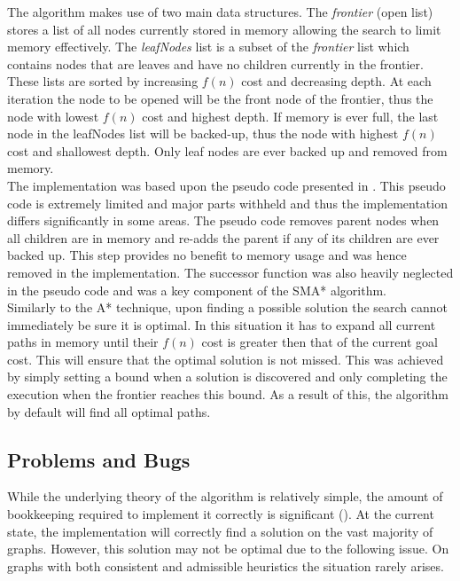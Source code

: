 \documentclass[]{article}
\begin{document}
The algorithm makes use of two main data structures. The \textit{frontier} (open list) stores a list of all nodes currently stored in memory allowing the search to limit memory effectively. The \textit{leafNodes} list is a subset of the \textit{frontier} list which contains nodes that are leaves and have no children currently in the frontier. These lists are sorted by increasing $f(n)$ cost and decreasing depth. At each iteration the node to be opened will be the front node of the frontier, thus the node with lowest $f(n)$ cost and highest depth. If memory is ever full, the last node in the leafNodes list will be backed-up, thus the node with highest $f(n)$ cost and shallowest depth. Only leaf nodes are ever backed up and removed from memory.\\

The implementation was based upon the pseudo code presented in \cite{russell_paper}. This pseudo code is extremely limited and major parts withheld and thus the implementation differs significantly in some areas. The pseudo code removes parent nodes when all children are in memory and re-adds the parent if any of its children are ever backed up. This step provides no benefit to memory usage and was hence removed in the implementation. The successor function was also heavily neglected in the pseudo code and was a key component of the SMA* algorithm.\\

Similarly to the A* technique, upon finding a possible solution the search cannot immediately be sure it is optimal. In this situation it has to expand all current paths in memory until their $f(n)$ cost is greater then that of the current goal cost. This will ensure that the optimal solution is not missed. This was achieved by simply setting a bound when a solution is discovered and only completing the execution when the frontier reaches this bound. As a result of this, the algorithm by default will find all optimal paths.

\pagebreak
\subsection*{Problems and Bugs}

While the underlying theory of the algorithm is relatively simple, the amount of bookkeeping required to implement it correctly is significant (\cite{norvig}). At the current state, the implementation will correctly find a solution on the vast majority of graphs. However, this solution may not be optimal due to the following issue. On graphs with both consistent and admissible heuristics the situation rarely arises.  \\
\end{document}

